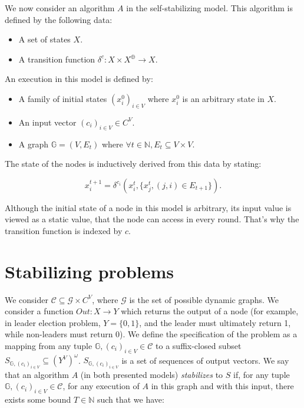 \documentclass[11pt,letterpaper]{article}
\begin{document}
We now consider an algorithm $A$ in the self-stabilizing model.
This algorithm is defined by the following data:

\begin{itemize}
	\item A set of states $X$.
	\item A transition function $\delta^c : X \times X^\oplus \rightarrow X$.
\end{itemize}

\noindent An execution in this model is defined by:
\begin{itemize}
	\item A family of initial states $(x_i^0)_{i \in V}$ where $x_i^0$ is an arbitrary state in $X$.
	\item An input vector $(c_i)_{i \in V} \in C^V$.
	\item A graph $\mathds{G} = (V, E_t)$ where $\forall t \in \mathds{N}, E_t \subseteq V \times V$.
\end{itemize}

The state of the nodes is inductively derived from this data by stating:

$$x_i^{t+1} = \delta^{c_i}(x_i^t, \{x_j^t, (j,i) \in E_{t+1}\}).$$

Although the initial state of a node in this model is arbitrary, its input value is viewed as a static value,
that the node can access in every round. That's why the transition function is indexed by $c$.

\section{Stabilizing problems}

We consider $\mathcal{C} \subseteq \mathcal{G} \times C^V$, where $\mathcal{G}$ is the set of possible dynamic graphs.
We consider a function $Out : X \rightarrow Y$ which returns the output of a node
(for example, in leader election problem, $Y = \{0,1\}$, and the leader must ultimately return 1, while non-leaders must return 0).
We define the specification of the problem as a mapping from any tuple $\mathds{G}, (c_i)_{i \in V} \in \mathcal{C}$
to a suffix-closed subset $S_{\mathds{G}, (c_i)_{i \in V}} \subseteq (Y^V)^\omega$.
$S_{\mathds{G}, (c_i)_{i \in V}}$ is a set of sequences of output vectors.
We say that an algorithm $A$ (in both presented models) \textit{stabilizes} to $S$ if, for any tuple $\mathds{G}, (c_i)_{i \in V} \in \mathcal{C}$,
for any execution of $A$ in this graph and with this input, there exists some bound $T \in \mathds{N}$ such that we have:
\end{document}

